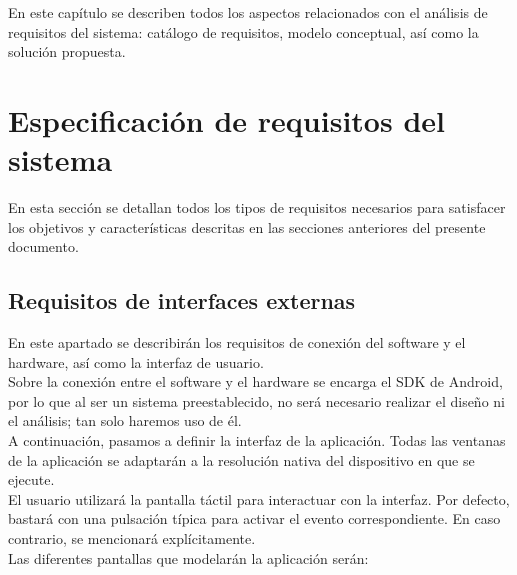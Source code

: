 

En este capítulo se describen todos los aspectos relacionados con el análisis de requisitos del sistema: catálogo de requisitos, modelo conceptual, así como la solución propuesta.

\section{Especificación de requisitos del sistema}

En esta sección se detallan todos los tipos de requisitos necesarios para satisfacer los objetivos y características descritas en las secciones anteriores del presente documento.\\

\subsection{Requisitos de interfaces externas}

En este apartado se describirán los requisitos de conexión del software y el hardware, así como la interfaz de usuario.\\

Sobre la conexión entre el software y el hardware se encarga el SDK de Android, por lo que al ser un sistema preestablecido, no será necesario realizar el diseño ni el análisis; tan solo haremos uso de él.\\

A continuación, pasamos a definir la interfaz de la aplicación. Todas las ventanas de la aplicación se adaptarán a la resolución nativa del dispositivo en que se ejecute.\\

El usuario utilizará la pantalla táctil para interactuar con la interfaz. Por defecto, bastará con una pulsación típica para activar el evento correspondiente. En caso contrario, se mencionará explícitamente.\\

Las diferentes pantallas que modelarán la aplicación serán:

